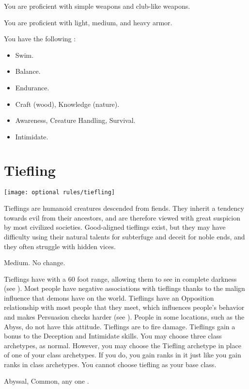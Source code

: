       You are proficient with simple weapons and club-like weapons.

      You are proficient with light, medium, and heavy armor.

      You have the following :
      \begin{itemize}
        \item {} Swim.
        \item {} Balance.
        \item {} Endurance.
        \item {} Craft (wood), Knowledge (nature).
        \item {} Awareness, Creature Handling, Survival.
        \item {} Intimidate.
      \end{itemize}

\section{Tiefling}
  \texttt{[image: optional rules/tiefling]}

  Tieflings are humanoid creatures descended from fiends.
  They inherit a tendency towards evil from their ancestors, and are therefore viewed with great suspicion by most civilized societies.
  Good-aligned tieflings exist, but they may have difficulty using their natural talents for subterfuge and deceit for noble ends, and they often struggle with hidden vices.

   Medium.
   No change.
  \begin{itemize}
     Tieflings have  with a 60 foot range, allowing them to see in complete darkness (see ).
     Most people have negative associations with tieflings thanks to the malign influence that demons have on the world.
      Tieflings have an Opposition relationship with most people that they meet, which influences people's behavior and makes Persuasion checks harder (see ).
      People in some locations, such as the Abyss, do not have this attitude.
     Tieflings are  to fire damage.
     Tieflings gain a  bonus to the Deception and Intimidate skills.
     You may choose three class archetypes, as normal.
      However, you may choose the Tiefling archetype in place of one of your class archetypes.
      If you do, you gain ranks in it just like you gain ranks in class archetypes.
      You cannot choose tiefling as your base class.
  \end{itemize}
   Abyssal, Common, any one .

